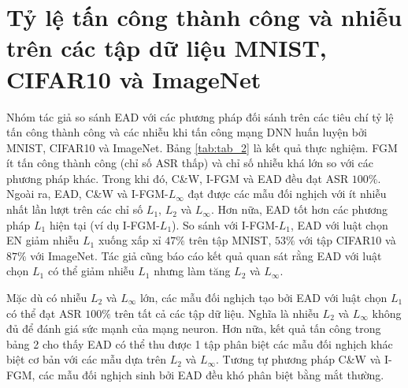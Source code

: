 \section{Tỷ lệ tấn công thành công và nhiễu trên các tập dữ liệu MNIST, CIFAR10 và ImageNet}
Nhóm tác giả so sánh EAD với các phương pháp đối sánh trên các tiêu chí tỷ lệ tấn công thành công và các nhiễu khi tấn công mạng DNN huấn luyện bởi MNIST, CIFAR10 và ImageNet. Bảng \ref{tab:tab_2} là kết quả thực nghiệm. FGM ít tấn công thành công (chỉ số ASR thấp) và chỉ số nhiễu khá lớn so với các phương pháp khác. Trong khi đó, C\&W, I-FGM và EAD đều đạt ASR $100\%$. Ngoài ra, EAD, C\&W và I-FGM-$L_{\infty}$ đạt được các mẫu đối nghịch với ít nhiễu nhất lần lượt trên các chỉ số  $L_1$, $L_2$ và $L_{\infty}$. Hơn nữa, EAD tốt hơn các phương pháp $L_1$ hiện tại (ví dụ I-FGM-$L_1$). So sánh với I-FGM-$L_1$, EAD với luật chọn EN giảm nhiễu $L_1$ xuống xấp xỉ $47\%$ trên tập MNIST, $53\%$ với tập CIFAR10 và $87\%$ với ImageNet. Tác giả cũng báo cáo kết quả quan sát rằng EAD với luật chọn $L_1$ có thể giảm nhiễu $L_1$ nhưng làm tăng $L_2$ và $L_{\infty}$.



Mặc dù có nhiễu $L_2$ và $L_{\infty}$ lớn, các mẫu đối nghịch tạo bởi EAD với luật chọn $L_1$ có thể đạt ASR $100\%$ trên tất cả các tập dữ liệu. Nghĩa là nhiễu $L_2$ và $L_{\infty}$ không đủ để đánh giá sức mạnh của mạng neuron. Hơn nữa, kết quả tấn công trong bảng 2 cho thấy EAD có thể thu được 1 tập phân biệt các mẫu đối nghịch khác biệt cơ bản với các mẫu dựa trên $L_2$ và $L_{\infty}$. Tương tự phương pháp C\&W và I-FGM, các mẫu đối nghịch sinh bởi EAD đều khó phân biệt bằng mắt thường. 
